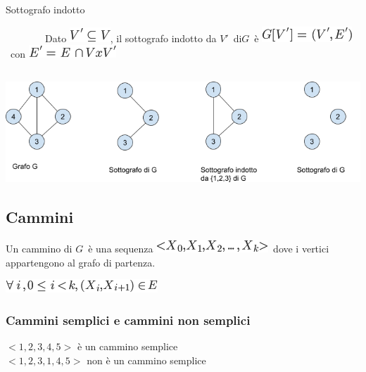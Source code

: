 \documentclass{article}
\begin{document}
{{Sottografo indotto }

{~~~~~~~~Dato }\includegraphics{images/image342.png}{, il sottografo
indotto da
}$V'${~di}$G${~è
}\includegraphics{images/image345.png}{~con
}\includegraphics{images/image346.png}{~ }

\subsection{\texorpdfstring{{\protect\includegraphics{images/image534.png}}}{}}\label{h.alw0becdzne2}

\hypertarget{h.lxvflhr4q9d8}{\subsection{\texorpdfstring{{Cammini}}{Cammini}}\label{h.lxvflhr4q9d8}}

{Un cammino di }$G${~è una sequenza
}\includegraphics{images/image347.png}{~dove i vertici appartengono al
grafo di partenza. }

\includegraphics{images/image348.png}

\hypertarget{h.sjz08mn040is}{\subsubsection{\texorpdfstring{{Cammini
semplici e cammini non
semplici}}{Cammini semplici e cammini non semplici}}\label{h.sjz08mn040is}}


$<1,2,3,4,5>$ è un cammino semplice\\
$<1,2,3,1,4,5>$ non è un cammino semplice

}
\end{document}
